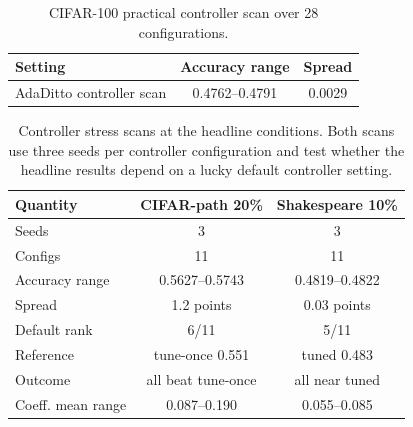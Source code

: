 \documentclass[letterpaper]{article}
\begin{document}
\begin{table}[t]
\centering
\small
\setlength{\tabcolsep}{8pt}
\renewcommand{\arraystretch}{1.08}
\begin{tabular*}{\textwidth}{@{\extracolsep{\fill}}lcc@{}}
\toprule
\textbf{Setting} & \textbf{Accuracy range} & \textbf{Spread} \\
\midrule
AdaDitto controller scan & 0.4762--0.4791 & 0.0029 \\
\bottomrule
\end{tabular*}
\caption{CIFAR-100 practical controller scan over 28 configurations.}
\label{tab:controller-scan}
\end{table}

\begin{table}[t]
\centering
\small
\setlength{\tabcolsep}{8pt}
\renewcommand{\arraystretch}{1.08}
\begin{tabular*}{\textwidth}{@{\extracolsep{\fill}}lcc@{}}
\toprule
\textbf{Quantity} & \textbf{CIFAR-path 20\%} & \textbf{Shakespeare 10\%} \\
\midrule
Seeds & 3 & 3 \\
Configs & 11 & 11 \\
Accuracy range & 0.5627--0.5743 & 0.4819--0.4822 \\
Spread & 1.2 points & 0.03 points \\
Default rank & 6/11 & 5/11 \\
Reference & tune-once 0.551 & tuned 0.483 \\
Outcome & all beat tune-once & all near tuned \\
Coeff. mean range & 0.087--0.190 & 0.055--0.085 \\
\bottomrule
\end{tabular*}
\caption{Controller stress scans at the headline conditions. Both scans use three seeds per controller configuration and test whether the headline results depend on a lucky default controller setting.}
\label{tab:headline-controller-scan}
\end{table}
\end{document}
